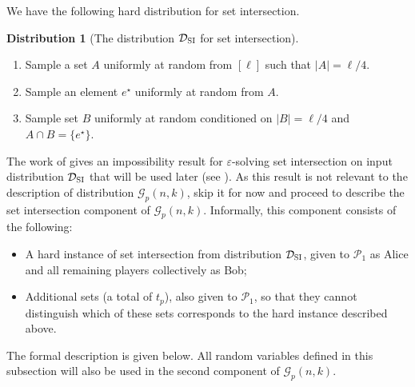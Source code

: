 \documentclass[11pt]{article}
\theoremstyle{definition}
\newenvironment{ourbox}{\begin{mdframed}[hidealllines=false,innerleftmargin=10pt,backgroundcolor=white!10,innertopmargin=5pt,innerbottommargin=5pt,roundcorner=10pt]}{\end{mdframed}}
\newtheorem{mddistribution}{Distribution}
\newenvironment{Distribution}{\begin{ourbox}\begin{mddistribution}}{\end{mddistribution}\end{ourbox}}
\newcommand{\eps}{\ensuremath{\varepsilon}}
\newcommand{\card}[1]{\left\vert{#1}\right\vert}
\newcommand{\player}[1]{\ensuremath{\mathcal{P}_{#1}}}
\newcommand{\cG}{\ensuremath{\mathcal{G}}}
\newcommand{\estar}{\ensuremath{e^{\star}}}
\newcommand{\cDSI}{\ensuremath{\mathcal{D}_{\textnormal{\textsc{SI}}}}}
\begin{document}
	We  have the following hard distribution for set intersection. 
	
	\begin{Distribution}[The distribution $\cDSI$ for set intersection]\label{dist:SI}
		~
		\begin{enumerate}[label=$(\roman*)$]
			\item Sample a set $A$ uniformly at random from $[\ell]$ such that $\card{A} = \ell/4$. 
			\item Sample an element $\estar $ uniformly at random from $A$. 
			\item Sample set $B$ uniformly at random conditioned on $\card{B} = \ell/4$ and $A \cap B = \{\estar\}$. 
		\end{enumerate}
		
	\end{Distribution}
	
	The work of \cite{AssadiR20} gives an impossibility result for $\eps$-solving set intersection on input distribution $\cDSI$ that will be used later (see ). As this result is not relevant to the description of distribution $\cG_p(n,k)$, 
	skip it for now and proceed to describe the set intersection component of $\cG_p(n,k)$. Informally, this component consists of the following:

	\begin{itemize}
		\item A hard instance of set intersection from distribution $\cDSI$, given to $\player{1}$ as Alice and all remaining players collectively as Bob;
		
		\item  Additional sets (a total of $t_p$), also given to $\player{1}$, so that they cannot distinguish which of these sets corresponds to the hard instance described above.
	\end{itemize}
	
	The formal description is given below. All random variables defined in this subsection will also be used in the second component of $\cG_p(n,k)$.
\end{document}
